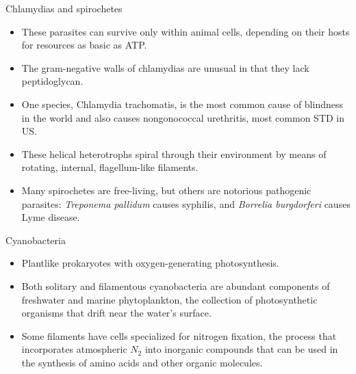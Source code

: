\documentclass[ignorenonframetext,aspectratio=169]{beamer}
\providecommand{\tightlist}{%
  \setlength{\itemsep}{0pt}\setlength{\parskip}{0pt}}
\begin{document}
\begin{frame}{Chlamydias and spirochetes}
\protect\hypertarget{chlamydias-and-spirochetes}{}

\begin{itemize}
\tightlist
\item
  These parasites can survive only within animal cells, depending on
  their hosts for resources as basic as ATP.
\item
  The gram-negative walls of chlamydias are unusual in that they lack
  peptidoglycan.
\item
  One species, Chlamydia trachomatis, is the most common cause of
  blindness in the world and also causes nongonococcal urethritis, most
  common STD in US.
\item
  These helical heterotrophs spiral through their environment by means
  of rotating, internal, flagellum-like filaments.
\item
  Many spirochetes are free-living, but others are notorious pathogenic
  parasites: \emph{Treponema pallidum} causes syphilis, and
  \emph{Borrelia burgdorferi} causes Lyme disease.
\end{itemize}

\end{frame}

\begin{frame}{Cyanobacteria}
\protect\hypertarget{cyanobacteria}{}

\begin{itemize}
\tightlist
\item
  Plantlike prokaryotes with oxygen-generating photosynthesis.
\item
  Both solitary and filamentous cyanobacteria are abundant components of
  freshwater and marine phytoplankton, the collection of photosynthetic
  organisms that drift near the water's surface.
\item
  Some filaments have cells specialized for nitrogen fixation, the
  process that incorporates atmospheric \(N_2\) into inorganic compounds
  that can be used in the synthesis of amino acids and other organic
  molecules.
\end{itemize}

\end{frame}
\end{document}
